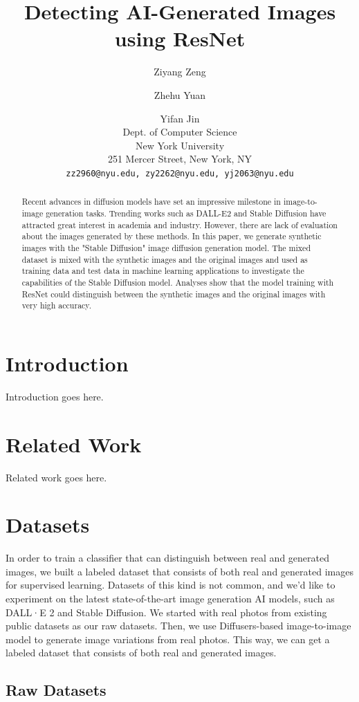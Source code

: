 \documentclass[11pt]{article}
\title{Detecting AI-Generated Images using ResNet}
\author{Ziyang Zeng \and Zhehu Yuan \and Yifan Jin \\
  Dept. of Computer Science \\
  New York University \\
  251 Mercer Street, New York, NY \\
  \texttt{zz2960@nyu.edu, zy2262@nyu.edu, yj2063@nyu.edu}}
\begin{document}
\maketitle
\begin{abstract}
  Recent advances in diffusion models have set an impressive milestone in image-to-image generation tasks. Trending works such as DALL-E2 and Stable Diffusion have attracted great interest in academia and industry. However, there are lack of evaluation about the images generated by these methods. In this paper, we generate synthetic images with the "Stable Diffusion" image diffusion generation model. The mixed dataset is mixed with the synthetic images and the original images and used as training data and test data in machine learning applications to investigate the capabilities of the Stable Diffusion model. Analyses show that the model training with ResNet could distinguish between the synthetic images and the original images with very high accuracy.
\end{abstract}

\section{Introduction}

Introduction goes here.

\section{Related Work}

Related work goes here.

\section{Datasets}

In order to train a classifier that can distinguish between real and generated images, we built a labeled dataset that consists of both real and generated images for supervised learning. Datasets of this kind is not common, and we'd like to experiment on the latest state-of-the-art image generation AI models, such as DALL·E 2 and Stable Diffusion. We started with real photos from existing public datasets as our raw datasets. Then, we use Diffusers-based image-to-image model to generate image variations from real photos. This way, we can get a labeled dataset that consists of both real and generated images.

\subsection{Raw Datasets}
\label{sec:raw_datasets}
\end{document}
